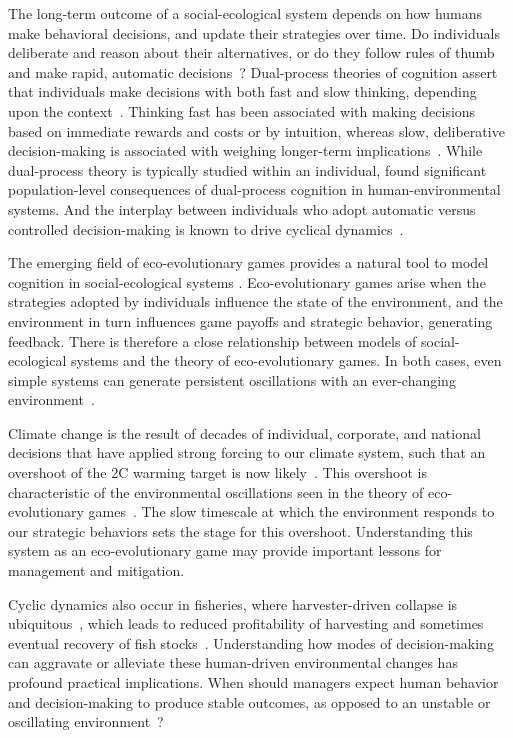 \documentclass{article}
\begin{document}
The long-term outcome of a social-ecological system depends on how humans make behavioral decisions, and update their strategies over time. Do individuals deliberate and reason about their alternatives, or do they follow rules of thumb and make rapid, automatic decisions~\citep{kahneman2003,evans2008,kahneman2011thinking}? Dual-process theories of cognition assert that individuals make decisions with both fast and slow thinking, depending upon the context~\citep{pennycook2017}. Thinking fast has been associated with making decisions based on immediate rewards and costs or by intuition, whereas slow, deliberative decision-making is  associated with weighing longer-term implications~\citep{mcclure2004,rand2016}. While dual-process theory is typically studied within an individual, \cite{tomlin2015} found significant population-level consequences of dual-process cognition in human-environmental systems. And the interplay between individuals who adopt automatic versus controlled decision-making is known to drive cyclical dynamics~\citep{rand2017}.

The emerging field of eco-evolutionary games provides a natural tool to model cognition in social-ecological systems \citep{weitz,estrela2019,tilman2020,wang2020steering,wang2020eco,lin2019spatial,barfuss2020caring}.  Eco-evolutionary games arise when the strategies adopted by individuals influence the state of the environment, and the environment in turn influences game payoffs and strategic behavior, generating feedback. There is therefore a close relationship between models of social-ecological systems and the theory of eco-evolutionary games. In both cases, even simple systems can generate persistent oscillations with an ever-changing environment~\citep{weitz,bieg2017,tilman2020}.

Climate change is the result of decades of individual, corporate, and national decisions that have applied strong forcing to our climate system, such that an overshoot of the  2\degree C  warming target is now  likely~\citep{ipcc}. This overshoot is characteristic of the environmental oscillations seen in the theory of eco-evolutionary games~\citep{menard2020conflicts,tilman2020}. The slow timescale at which the environment responds to our strategic behaviors sets the stage for this overshoot. Understanding this system as an eco-evolutionary game may provide important lessons for management and mitigation.

Cyclic dynamics also occur in fisheries, where harvester-driven collapse is ubiquitous~\citep{pauly1998, essington2015}, which leads to reduced profitability of harvesting and sometimes eventual recovery of fish stocks~\citep{hutchings2000, worm2009}. Understanding how modes of decision-making can aggravate or alleviate these human-driven environmental changes has profound practical implications. When should managers expect human behavior and decision-making to produce stable outcomes, as opposed to an unstable or oscillating environment~\citep{bieg2017}?
\end{document}
